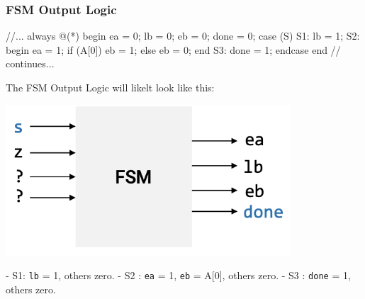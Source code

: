 \documentclass[12pt,openany]{book}
\begin{document}
\subsubsection{FSM Output Logic}
\begin{minipage}[htp]{0.45\textwidth}
\begin{vhdl}
//...
always @(*) begin
	ea = 0;
	lb = 0;
	eb = 0;
	done = 0;
	case (S)
	S1: lb = 1;
	S2: begin
			ea = 1;
			if (A[0]) eb = 1;
			else eb = 0;
		end
	S3: done = 1;
	endcase
end
// continues...
\end{vhdl}
\end{minipage}
\hfill\vline
\hfill
\begin{minipage}[htp]{0.45\textwidth}
The FSM Output Logic will likelt look like this:
\begin{center}
	\includegraphics[width=0.8\textwidth]{circuits/18.4_2.png}
\end{center}

- S1: \texttt{lb} = 1, others zero. \newline
- S2 : \texttt{ea} = 1, \texttt{eb} = A[0], others zero. \newline
- S3 : \texttt{done} = 1, others zero. \newline
\end{minipage}
\end{document}
